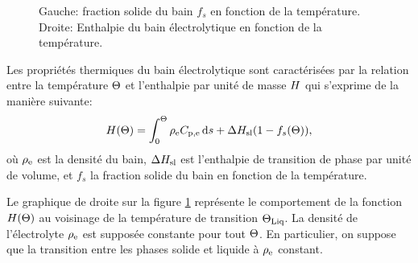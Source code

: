 \begin{figure}
  \begin{center}
    
    
    \caption{Gauche: fraction solide du bain $f_s$ en fonction de la
      température. Droite: Enthalpie du bain électrolytique en
      fonction de la température.}
    \label{fig:solid-fraction-enthalpy}
  \end{center}
\end{figure}

Les propriétés thermiques du bain électrolytique sont
caractérisées par la relation entre la température $\Theta$ et
l'enthalpie par unité de masse $H$ qui s'exprime de la manière
suivante:
\begin{equation}
  \enthalpy(\temperature) = %
    \int_0^\temperature
      \electrolytedensity\electrolytehc\intd{s} %
    + \fusionenthalpy(1 - f_s(\temperature)),
\end{equation}
où $\rho_\mathrm{e}$ est la densité du bain, $\Delta H_\mathrm{sl}$ est
l'enthalpie de transition de phase par unité de volume, et $f_s$ la
fraction solide du bain en fonction de la température.

Le graphique de droite sur la figure \ref{fig:solid-fraction-enthalpy}
représente le comportement de la fonction $H(\Theta)$ au
voisinage de la température de transition $\Theta_\text{Liq}$. La densité de
l'électrolyte $\rho_\mathrm{e}$ est supposée constante pour tout
$\Theta$. En particulier, on suppose que la transition entre les
phases solide et liquide à $\rho_\mathrm{e}$ constant.

